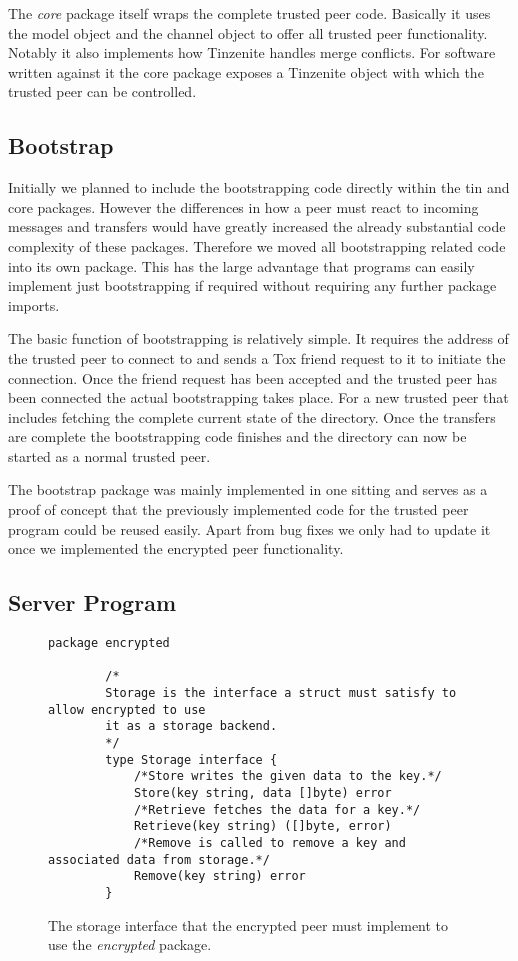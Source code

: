 The \emph{core} package itself wraps the complete trusted peer code.
Basically it uses the model object and the channel object to offer all trusted peer functionality.
Notably it also implements how Tinzenite handles merge conflicts.
For software written against it the core package exposes a Tinzenite object with which the trusted peer can be controlled.

\subsection{Bootstrap}
\label{sub:Bootstrap}

Initially we planned to include the bootstrapping code directly within the tin and core packages.
However the differences in how a peer must react to incoming messages and transfers would have greatly increased the already substantial code complexity of these packages.
Therefore we moved all bootstrapping related code into its own package.
This has the large advantage that programs can easily implement just bootstrapping if required without requiring any further package imports.

The basic function of bootstrapping is relatively simple.
It requires the address of the trusted peer to connect to and sends a Tox friend request to it to initiate the connection.
Once the friend request has been accepted and the trusted peer has been connected the actual bootstrapping takes place.
For a new trusted peer that includes fetching the complete current state of the directory.
Once the transfers are complete the bootstrapping code finishes and the directory can now be started as a normal trusted peer.

The bootstrap package was mainly implemented in one sitting and serves as a proof of concept that the previously implemented code for the trusted peer program could be reused easily.
Apart from bug fixes we only had to update it once we implemented the encrypted peer functionality.

\subsection{Server Program}
\label{sub:Server Program}

\begin{figure}[htp]
    \begin{lstlisting}[language=golang,firstnumber=0]
        package encrypted

        /*
        Storage is the interface a struct must satisfy to allow encrypted to use
        it as a storage backend.
        */
        type Storage interface {
        	/*Store writes the given data to the key.*/
        	Store(key string, data []byte) error
        	/*Retrieve fetches the data for a key.*/
        	Retrieve(key string) ([]byte, error)
        	/*Remove is called to remove a key and associated data from storage.*/
        	Remove(key string) error
        }
    \end{lstlisting}
\caption[Golang Storage Interface]{The storage interface that the encrypted peer must implement to use the \emph{encrypted} package.}
\label{golang:storage_interface}
\end{figure}

